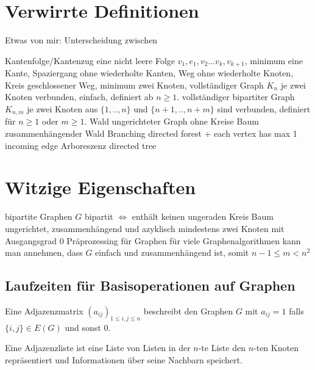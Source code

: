 \section{Verwirrte Definitionen}

Etwas von mir: Unterscheidung zwischen 
\begin{outline}
    \1 Kantenfolge/Kantenzug 
        \2 eine nicht leere Folge $v_1,e_1,v_2\ldots v_k, v_{k+1}$, 
        \2 minimum eine Kante,
    \1 Spaziergang
        \2 ohne wiederholte Kanten,
    \1 Weg
        \2 ohne wiederholte Knoten,
    \1 Kreis
        \2 geschlossener Weg,
        \2 minimum zwei Knoten,
    \1 vollständiger Graph $K_n$ 
        \2 je zwei Knoten verbunden,
        \2 einfach, definiert ab $n\geq 1$.
    \1 vollständiger bipartiter Graph $K_{n,m}$
        \2 je zwei Knoten aus $\{1,..,n\}$ und $\{n+1,..,n+m\}$ sind verbunden,
        \2 definiert für $n\geq 1$ oder $m\geq 1$.
    \1 Wald
        \2 ungerichteter Graph ohne Kreise
    \1 Baum
        \2 zusammenhängender Wald
    \1 Branching
        \2 directed forest + each vertex has max 1 incoming edge
    \1 Arboreszenz
        \2 directed tree
\end{outline}

\section{Witzige Eigenschaften}
\begin{outline}
    \1 bipartite Graphen
        \2 $G$ bipartit $\iff$ enthält keinen ungeraden Kreis
    \1 Baum
        \2 ungerichtet, zusammenhängend und azyklisch
        \2 mindestens zwei Knoten mit Ausgangsgrad $0$ 
    \1 Präprozessing für Graphen
        \2 für viele Graphenalgorithmen kann man annehmen, dass $G$ einfach und zusammenhängend ist, somit $n - 1 \leq m < n^2$
\end{outline}

\subsection{Laufzeiten für Basisoperationen auf Graphen}

Eine Adjazenzmatrix $(a_{ij})_{1\leq i,j\leq n}$ beschreibt den Graphen $G$ mit $a_{ij}=1$ falls $\{i,j\}\in E(G)$ und sonst $0$.

Eine Adjazenzliste ist eine Liste von Listen in der $n$-te Liste den $n$-ten Knoten repräsentiert und Informationen über seine Nachbarn speichert.

